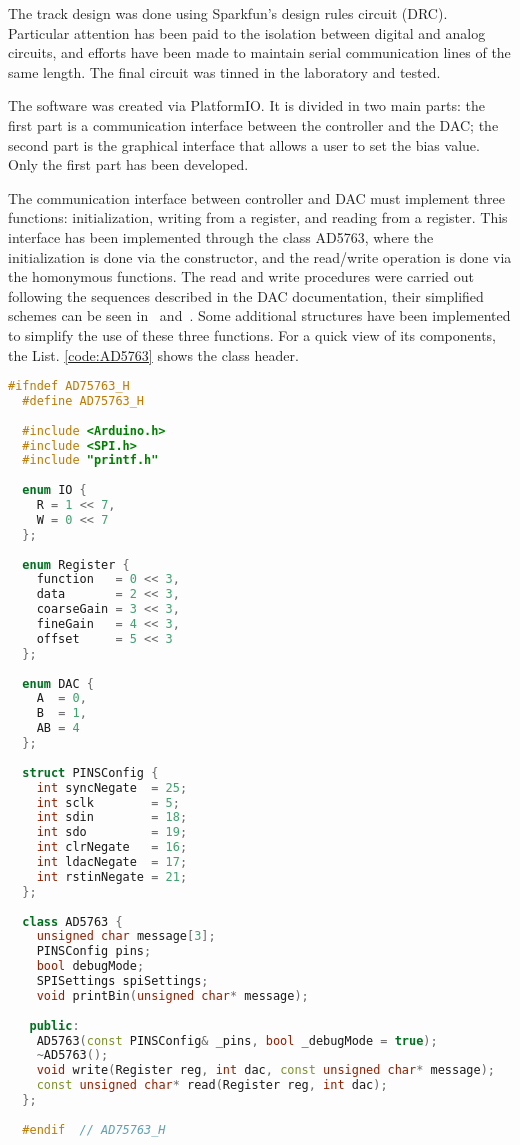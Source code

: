 The track design was done using Sparkfun’s design rules circuit (DRC). Particular attention has been paid to the isolation between digital and analog circuits, and efforts have been made to maintain serial communication lines of the same length. The final circuit was tinned in the laboratory and tested.

The software was created via PlatformIO. It is divided in two main parts: the first part is a communication interface between the controller and the DAC; the second part is the graphical interface that allows a user to set the bias value. Only the first part has been developed.


The communication interface between controller and DAC must implement three functions: initialization, writing from a register, and reading from a register. This interface has been implemented through the class AD5763, where the initialization is done via the constructor, and the read/write operation is done via the homonymous functions. The read and write procedures were carried out following the sequences described in the DAC documentation, their simplified schemes can be seen in~ and~. Some additional structures have been implemented to simplify the use of these three functions.
For a quick view of its components, the List. \ref{code:AD5763} shows the class header.
\begin{lstlisting}[language=c++, gobble=2, label=code:AD5763]
  #ifndef AD75763_H
  #define AD75763_H
  
  #include <Arduino.h>
  #include <SPI.h>
  #include "printf.h"
  
  enum IO {
    R = 1 << 7,
    W = 0 << 7
  };
  
  enum Register {
    function   = 0 << 3,
    data       = 2 << 3,
    coarseGain = 3 << 3,
    fineGain   = 4 << 3,
    offset     = 5 << 3
  };
  
  enum DAC {
    A  = 0,
    B  = 1,
    AB = 4
  };
  
  struct PINSConfig {
    int syncNegate  = 25;
    int sclk        = 5;
    int sdin        = 18;
    int sdo         = 19;
    int clrNegate   = 16;
    int ldacNegate  = 17;
    int rstinNegate = 21;
  };
  
  class AD5763 {
    unsigned char message[3];
    PINSConfig pins;
    bool debugMode;
    SPISettings spiSettings;
    void printBin(unsigned char* message);
  
   public:
    AD5763(const PINSConfig& _pins, bool _debugMode = true);
    ~AD5763();
    void write(Register reg, int dac, const unsigned char* message);
    const unsigned char* read(Register reg, int dac);
  };
  
  #endif  // AD75763_H
\end{lstlisting}


